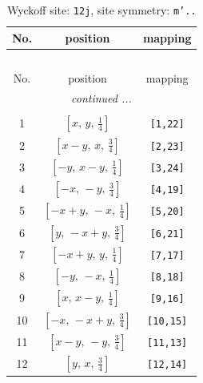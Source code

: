 \documentclass[fleqn,8pt]{jsarticle}
\begin{document}
\begin{longtable}{ccc}
\caption{Wyckoff site: {\tt 12j}, site symmetry: {\tt m'..}}
 \\
 \hline \hline
No. & position & mapping \\ \hline \endfirsthead

\multicolumn{2}{l}{\tablename\ \thetable{}} \\
 \hline \hline
No. & position & mapping \\ \hline \endhead

 \hline \hline
\multicolumn{2}{r}{\footnotesize\it continued ...} \\ \endfoot

 \hline \hline
\multicolumn{2}{r}{} \\ \endlastfoot

1 & $\left[ x,\, y,\, \frac{1}{4} \right]$ & {\tt [1,22]} \\ \hline
2 & $\left[ x - y,\, x,\, \frac{3}{4} \right]$ & {\tt [2,23]} \\ \hline
3 & $\left[ - y,\, x - y,\, \frac{1}{4} \right]$ & {\tt [3,24]} \\ \hline
4 & $\left[ - x,\, - y,\, \frac{3}{4} \right]$ & {\tt [4,19]} \\ \hline
5 & $\left[ - x + y,\, - x,\, \frac{1}{4} \right]$ & {\tt [5,20]} \\ \hline
6 & $\left[ y,\, - x + y,\, \frac{3}{4} \right]$ & {\tt [6,21]} \\ \hline
7 & $\left[ - x + y,\, y,\, \frac{1}{4} \right]$ & {\tt [7,17]} \\ \hline
8 & $\left[ - y,\, - x,\, \frac{1}{4} \right]$ & {\tt [8,18]} \\ \hline
9 & $\left[ x,\, x - y,\, \frac{1}{4} \right]$ & {\tt [9,16]} \\ \hline
10 & $\left[ - x,\, - x + y,\, \frac{3}{4} \right]$ & {\tt [10,15]} \\ \hline
11 & $\left[ x - y,\, - y,\, \frac{3}{4} \right]$ & {\tt [11,13]} \\ \hline
12 & $\left[ y,\, x,\, \frac{3}{4} \right]$ & {\tt [12,14]} \\
\end{longtable}
\renewcommand{\arraystretch}{1.2}
\end{document}
